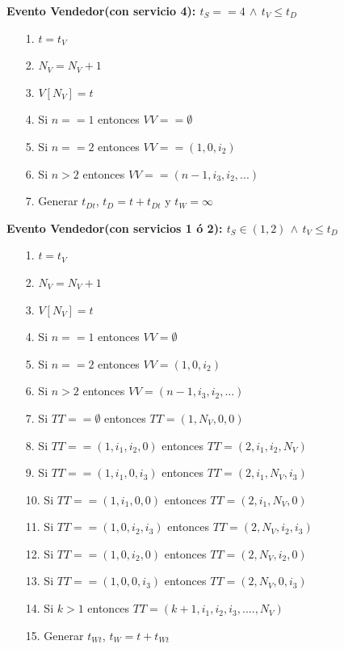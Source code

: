 \documentclass[12pt]{article}
\begin{document}
\noindent \textbf{Evento Vendedor(con servicio 4): $t_S == 4$ $\wedge$ $t_V \leq t_D$}
\begin{itemize}
        \item[1.] $t = t_V$
        \item[2.] $N_V = N_V + 1$
        \item[3.] $V[N_V] = t$
        
        \item[4.] Si $n == 1$ entonces $VV == \emptyset$
        \item[5.] Si $n == 2$ entonces $VV == (1, 0, i_2)$
        \item[6.] Si $n > 2$ entonces $VV == (n-1, i_3, i_2, ...)$
        
        \item[7.] Generar $t_{Dt}$, $t_D = t + t_{Dt}$ y $t_W = \infty$
\end{itemize}

\noindent \textbf{Evento Vendedor(con servicios 1 \'o 2): $t_S \in (1,2)$ $\wedge$ $t_V \leq t_D$ }
\begin{itemize}
        \item[1.] $t = t_V$
        \item[2.] $N_V = N_V + 1$
        \item[3.] $V[N_V] = t$ 
        
        \item[4.] Si $n == 1$ entonces $VV = \emptyset$
        \item[5.] Si $n == 2$ entonces $VV = (1, 0, i_2)$
        \item[6.] Si $n > 2$ entonces $VV = (n - 1, i_3, i_2,...)$
        
        \item[7.] Si $TT == \emptyset$ entonces $TT = (1, N_V, 0, 0)$
        \item[8.] Si $TT == (1, i_1, i_2, 0)$ entonces $TT = (2, i_1, i_2, N_V)$
        \item[9.] Si $TT == (1, i_1, 0, i_3)$ entonces $TT = (2, i_1, N_V, i_3)$
        \item[10.] Si $TT == (1, i_1, 0, 0)$ entonces $TT = (2, i_1, N_V, 0)$
        \item[11.] Si $TT == (1, 0, i_2, i_3)$ entonces $TT = (2, N_V, i_2, i_3)$
        \item[12.] Si $TT == (1, 0, i_2, 0)$ entonces $TT = (2, N_V, i_2, 0)$
        \item[13.] Si $TT == (1, 0, 0, i_3)$ entonces $TT = (2, N_V, 0, i_3)$
        \item[14.] Si $k > 1$ entonces $TT = (k+1, i_1, i_2, i_3,...., N_V)$
        
        \item[15.] Generar $t_{Wt}$, $t_W = t + t_{Wt}$
\end{itemize}
\end{document}
